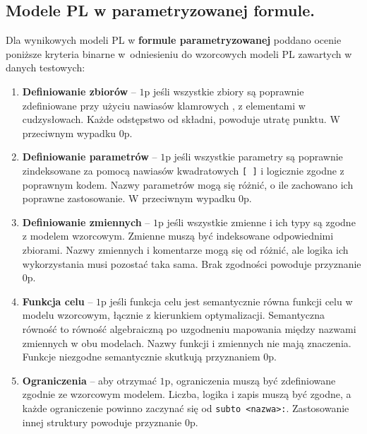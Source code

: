 \subsection{Modele PL w parametryzowanej formule.}

Dla wynikowych modeli PL w \textbf{formule parametryzowanej} poddano ocenie poniższe kryteria binarne w~odniesieniu do wzorcowych modeli PL zawartych w danych testowych: 

\begin{enumerate}
\item \textbf{Definiowanie zbiorów} -- $1$p jeśli wszystkie zbiory są poprawnie zdefiniowane przy użyciu nawiasów klamrowych \texttt{{}}, z elementami w cudzysłowach. %
 Każde odstępstwo od składni, powoduje utratę punktu. %
 W przeciwnym wypadku $0$p.
\item \textbf{Definiowanie parametrów} -- $1$p jeśli wszystkie parametry są poprawnie zindeksowane za pomocą nawiasów kwadratowych \texttt{[ ]} %
i logicznie zgodne z poprawnym kodem. %
Nazwy parametrów mogą się różnić, o ile zachowano ich poprawne zastosowanie. W przeciwnym wypadku $0$p.
\item \textbf{Definiowanie zmiennych} -- $1$p jeśli wszystkie zmienne i ich typy %
są zgodne z modelem wzorcowym. Zmienne muszą być indeksowane odpowiednimi zbiorami. Nazwy zmiennych i komentarze mogą się od różnić, ale logika ich wykorzystania musi pozostać taka sama. Brak zgodności powoduje przyznanie $0$p.
\item \textbf{Funkcja celu} -- $1$p jeśli funkcja celu jest semantycznie równa funkcji celu w modelu wzorcowym, łącznie z kierunkiem optymalizacji. Semantyczna równość to równość algebraiczną po uzgodneniu mapowania między nazwami zmiennych w obu modelach. Nazwy funkcji i zmiennych nie mają znaczenia. Funkcje niezgodne semantycznie skutkują przyznaniem $0$p.
\item \textbf{Ograniczenia} -- aby otrzymać $1$p, ograniczenia muszą być zdefiniowane zgodnie ze wzorcowym modelem. Liczba, logika i zapis muszą być zgodne, a każde ograniczenie powinno zaczynać się od \texttt{subto <nazwa>:}. Zastosowanie innej struktury powoduje przyznanie $0$p.

\end{enumerate}
